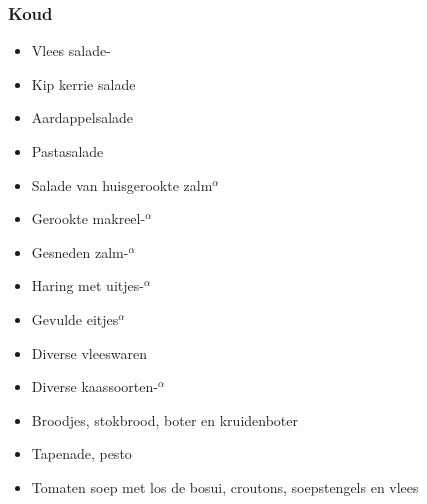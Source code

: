 \subsubsection{Koud}
\begin{itemize}
	\item	Vlees salade-
	\item	Kip kerrie salade
	\item	Aardappelsalade
	\item	Pastasalade
	\item	Salade van huisgerookte zalm$^{\alpha}$
	\item	Gerookte makreel-$^{\alpha}$
	\item	Gesneden zalm-$^{\alpha}$
	\item	Haring met uitjes-$^{\alpha}$
	\item	Gevulde eitjes$^{\alpha}$
	\item	Diverse vleeswaren
	\item	Diverse kaassoorten-$^{\alpha}$
	\item	Broodjes, stokbrood, boter en kruidenboter
	\item	Tapenade, pesto
	\item	Tomaten soep met los de bosui, croutons, soepstengels en vlees
\end{itemize}
